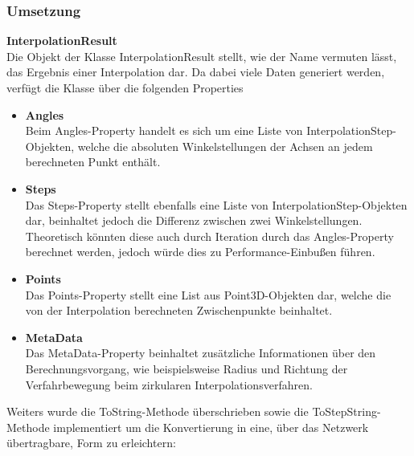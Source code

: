 \subsubsection{Umsetzung}
\textbf{InterpolationResult}\\
Die Objekt der Klasse InterpolationResult stellt, wie der Name vermuten lässt, das Ergebnis einer Interpolation dar. Da dabei viele Daten generiert werden, verfügt die Klasse über die folgenden Properties
\begin{itemize}
\item \textbf{Angles}\\
Beim Angles-Property handelt es sich um eine Liste von InterpolationStep-Objekten, welche die absoluten Winkelstellungen der Achsen an jedem berechneten Punkt enthält. 
\item \textbf{Steps}\\
Das Steps-Property stellt ebenfalls eine Liste von InterpolationStep-Objekten dar, beinhaltet jedoch die Differenz zwischen zwei Winkelstellungen. Theoretisch könnten diese auch durch Iteration durch das Angles-Property berechnet werden, jedoch würde dies zu Performance-Einbußen führen. 
\item \textbf{Points}\\
Das Points-Property stellt eine List aus Point3D-Objekten dar, welche die von der Interpolation berechneten Zwischenpunkte beinhaltet.
\item \textbf{MetaData}\\
Das MetaData-Property beinhaltet zusätzliche Informationen über den Berechnungsvorgang, wie beispielsweise Radius und Richtung der Verfahrbewegung beim zirkularen Interpolationsverfahren.
\end{itemize}
Weiters wurde die ToString-Methode überschrieben sowie die ToStepString-Methode implementiert um die Konvertierung in eine, über das Netzwerk übertragbare, Form zu erleichtern:
